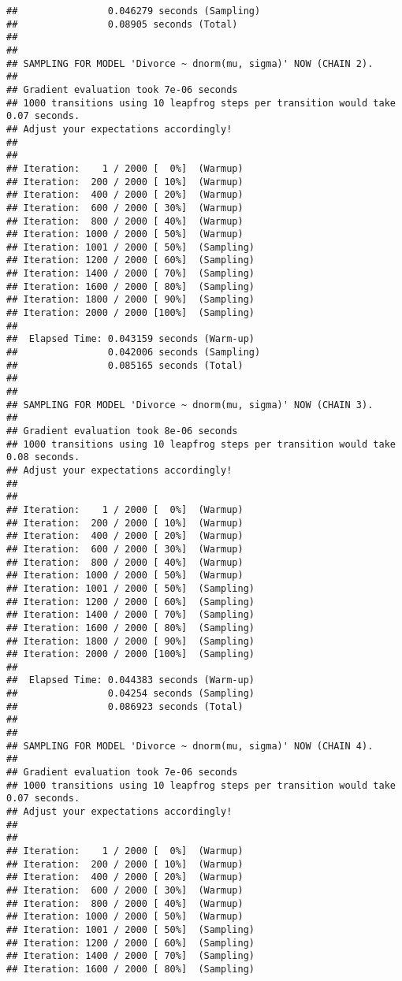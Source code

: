 \documentclass[]{article}
\begin{document}
\begin{verbatim}
##                0.046279 seconds (Sampling)
##                0.08905 seconds (Total)
## 
## 
## SAMPLING FOR MODEL 'Divorce ~ dnorm(mu, sigma)' NOW (CHAIN 2).
## 
## Gradient evaluation took 7e-06 seconds
## 1000 transitions using 10 leapfrog steps per transition would take 0.07 seconds.
## Adjust your expectations accordingly!
## 
## 
## Iteration:    1 / 2000 [  0%]  (Warmup)
## Iteration:  200 / 2000 [ 10%]  (Warmup)
## Iteration:  400 / 2000 [ 20%]  (Warmup)
## Iteration:  600 / 2000 [ 30%]  (Warmup)
## Iteration:  800 / 2000 [ 40%]  (Warmup)
## Iteration: 1000 / 2000 [ 50%]  (Warmup)
## Iteration: 1001 / 2000 [ 50%]  (Sampling)
## Iteration: 1200 / 2000 [ 60%]  (Sampling)
## Iteration: 1400 / 2000 [ 70%]  (Sampling)
## Iteration: 1600 / 2000 [ 80%]  (Sampling)
## Iteration: 1800 / 2000 [ 90%]  (Sampling)
## Iteration: 2000 / 2000 [100%]  (Sampling)
## 
##  Elapsed Time: 0.043159 seconds (Warm-up)
##                0.042006 seconds (Sampling)
##                0.085165 seconds (Total)
## 
## 
## SAMPLING FOR MODEL 'Divorce ~ dnorm(mu, sigma)' NOW (CHAIN 3).
## 
## Gradient evaluation took 8e-06 seconds
## 1000 transitions using 10 leapfrog steps per transition would take 0.08 seconds.
## Adjust your expectations accordingly!
## 
## 
## Iteration:    1 / 2000 [  0%]  (Warmup)
## Iteration:  200 / 2000 [ 10%]  (Warmup)
## Iteration:  400 / 2000 [ 20%]  (Warmup)
## Iteration:  600 / 2000 [ 30%]  (Warmup)
## Iteration:  800 / 2000 [ 40%]  (Warmup)
## Iteration: 1000 / 2000 [ 50%]  (Warmup)
## Iteration: 1001 / 2000 [ 50%]  (Sampling)
## Iteration: 1200 / 2000 [ 60%]  (Sampling)
## Iteration: 1400 / 2000 [ 70%]  (Sampling)
## Iteration: 1600 / 2000 [ 80%]  (Sampling)
## Iteration: 1800 / 2000 [ 90%]  (Sampling)
## Iteration: 2000 / 2000 [100%]  (Sampling)
## 
##  Elapsed Time: 0.044383 seconds (Warm-up)
##                0.04254 seconds (Sampling)
##                0.086923 seconds (Total)
## 
## 
## SAMPLING FOR MODEL 'Divorce ~ dnorm(mu, sigma)' NOW (CHAIN 4).
## 
## Gradient evaluation took 7e-06 seconds
## 1000 transitions using 10 leapfrog steps per transition would take 0.07 seconds.
## Adjust your expectations accordingly!
## 
## 
## Iteration:    1 / 2000 [  0%]  (Warmup)
## Iteration:  200 / 2000 [ 10%]  (Warmup)
## Iteration:  400 / 2000 [ 20%]  (Warmup)
## Iteration:  600 / 2000 [ 30%]  (Warmup)
## Iteration:  800 / 2000 [ 40%]  (Warmup)
## Iteration: 1000 / 2000 [ 50%]  (Warmup)
## Iteration: 1001 / 2000 [ 50%]  (Sampling)
## Iteration: 1200 / 2000 [ 60%]  (Sampling)
## Iteration: 1400 / 2000 [ 70%]  (Sampling)
## Iteration: 1600 / 2000 [ 80%]  (Sampling)

\end{verbatim}
\end{document}
